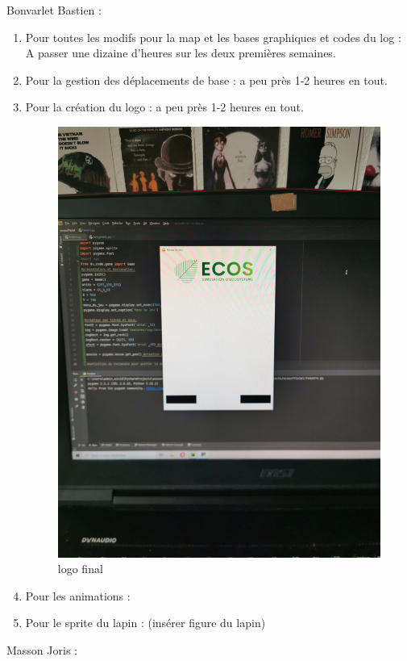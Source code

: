 \documentclass[a4paper, 11pt]{article}
\begin{document}
Bonvarlet Bastien :\\
\begin{enumerate}
\item Pour toutes les modifs pour la map et les bases graphiques et codes du log : A passer une dizaine d'heures sur les deux premières semaines.\\
\item Pour la gestion des déplacements de base : a peu près 1-2 heures en tout.\\
\item Pour la création du logo : a peu près 1-2 heures en tout.\\
\begin{figure}[ht!]
 \centering
 \includegraphics[width=0.5\linewidth]{images/creation_logo.jpg}
 \caption{logo final}
 \label{fig::example::one}
\end{figure}
\item Pour les animations : \\
\item Pour le sprite du lapin : (insérer figure du lapin)\\
\end{enumerate}
\newpage
Masson Joris : \\
\end{document}
